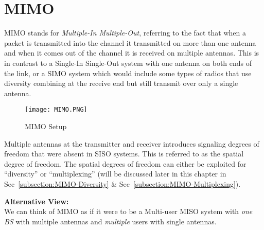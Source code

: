 \section{MIMO}
MIMO stands for \emph{Multiple-In Multiple-Out}, referring to the fact that when a packet is transmitted into the channel it transmitted on more than one antenna and when it comes out of the channel it is received on multiple antennas. This is in contrast to a Single-In Single-Out system with one antenna on both ends of the link, or a SIMO system which would include some types of radios that use diversity combining at the receive end but still transmit over only a single antenna.
\begin{figure}[ht]
    \centering
    \texttt{[image: MIMO.PNG]}
    \caption{MIMO Setup}
    \label{fig:MIMO}
\end{figure}

Multiple antennas at the transmitter and receiver introduces signaling degrees of freedom that were absent in SISO systems. This is referred to as the spatial degree of freedom. The spatial degrees of freedom can either be exploited for “diversity” or “multiplexing” (will be discussed later in this chapter in Sec~\ref{subsection:MIMO-Diversity} \& Sec~\ref{subsection:MIMO-Multiplexing}).

\begin{GrayBox}
    \textbf{Alternative View:} \\
    We can think of MIMO as if it were to be a Multi-user MISO system with \emph{one BS} with multiple antennas and \emph{multiple} users with single antennas.
\end{GrayBox}

